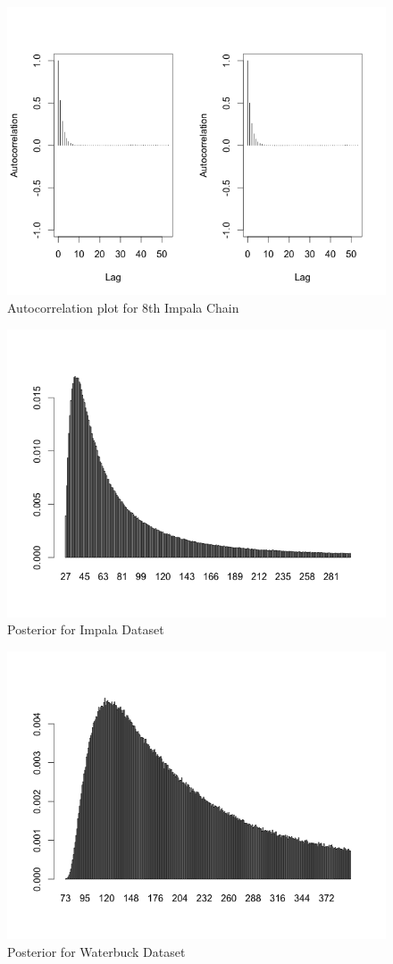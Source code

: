 \documentclass[paper=a4, fontsize=11pt]{scrartcl}
\begin{document}
\begin{figure}[h!]
  \caption{Autocorrelation plot for 8th Impala Chain}
  \centering
	\includegraphics[scale=.8]{Rplot_job8b.png}
\end{figure}

\begin{figure}[h!]
  \caption{Posterior for Impala Dataset}
  \centering
	\includegraphics[scale=.8]{impala.png}
\end{figure}

\begin{figure}[h!]
  \caption{Posterior for Waterbuck Dataset}
  \centering
	\includegraphics[scale=.8]{waterbuck.png}
\end{figure}
\end{document}
